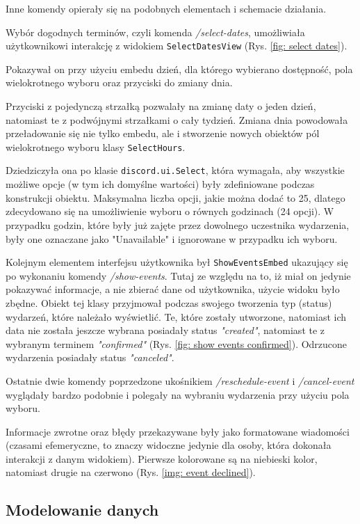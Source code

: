\documentclass[11pt,a4paper]{article}
\newcommand{\classname}[1]{\texttt{#1}}
\begin{document}
Inne komendy opierały się na podobnych elementach i schemacie działania. 

Wybór dogodnych terminów, czyli komenda \textit{/select-dates}, umożliwiała użytkownikowi interakcję z widokiem \classname{SelectDatesView} (Rys. \ref{fig: select dates}). 

Pokazywał on przy użyciu embedu dzień, dla którego wybierano dostępność, pola wielokrotnego wyboru oraz przyciski do zmiany dnia.

Przyciski z pojedynczą strzałką pozwalały na zmianę daty o jeden dzień, natomiast te z podwójnymi strzałkami o cały tydzień. Zmiana dnia powodowała przeładowanie się nie tylko embedu, ale i stworzenie nowych obiektów pól wielokrotnego wyboru klasy \classname{SelectHours}. 

Dziedziczyła ona po klasie \classname{discord.ui.Select}, która wymagała, aby wszystkie możliwe opcje (w tym ich domyślne wartości) były zdefiniowane podczas konstrukcji obiektu. Maksymalna liczba opcji, jakie można dodać to 25, dlatego zdecydowano się na umożliwienie wyboru o równych godzinach (24 opcji). W przypadku godzin, które były już zajęte przez dowolnego uczestnika wydarzenia, były one oznaczane jako "Unavailable" i ignorowane w przypadku ich wyboru. 

Kolejnym elementem interfejsu użytkownika był \classname{ShowEventsEmbed} ukazujący się po wykonaniu komendy \textit{/show-events}. Tutaj ze względu na to, iż miał on jedynie pokazywać informacje, a nie zbierać dane od użytkownika, użycie widoku było zbędne. Obiekt tej klasy przyjmował podczas swojego tworzenia typ (status) wydarzeń, które należało wyświetlić. Te, które zostały utworzone, natomiast ich data nie została jeszcze wybrana posiadały status \textit{"created"}, natomiast te z wybranym terminem \textit{"confirmed"} (Rys. \ref{fig: show events confirmed}). Odrzucone wydarzenia posiadały status \textit{"canceled"}. 

Ostatnie dwie komendy poprzedzone ukośnikiem \textit{/reschedule-event} i \textit{/cancel-event} wyglądały bardzo podobnie i polegały na wybraniu wydarzenia przy użyciu pola wyboru.

Informacje zwrotne oraz błędy przekazywane były jako formatowane wiadomości (czasami efemeryczne, to znaczy widoczne jedynie dla osoby, która dokonała interakcji z danym widokiem). Pierwsze kolorowane są na niebieski kolor, natomiast drugie na czerwono (Rys. \ref{img: event declined}).


\subsection{Modelowanie danych}
\end{document}
